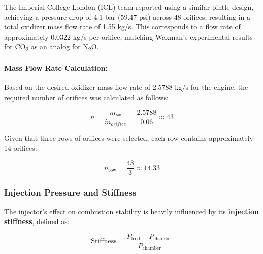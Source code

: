 The Imperial College London (ICL) team reported using a similar pintle design, achieving a pressure drop of 4.1 bar (59.47 psi) across 48 orifices, resulting in a total oxidizer mass flow rate of 1.55 kg/s. This corresponds to a flow rate of approximately 0.0322 kg/s per orifice, matching Waxman’s experimental results for CO\textsubscript{2} as an analog for N\textsubscript{2}O.

\paragraph{Mass Flow Rate Calculation:}
Based on the desired oxidizer mass flow rate of 2.5788 kg/s for the engine, the required number of orifices was calculated as follows:

\begin{equation}
n = \frac{\dot{m}_{ox}}{\dot{m}_{orifice}} = \frac{2.5788}{0.06} \approx 43
\end{equation}

Given that three rows of orifices were selected, each row contains approximately 14 orifices:

\begin{equation}
n_{\text{row}} = \frac{43}{3} \approx 14.33
\end{equation}


\subsubsection{Injection Pressure and Stiffness}

The injector's effect on combustion stability is heavily influenced by its \textbf{injection stiffness}, defined as:

\begin{equation}
\text{Stiffness} = \frac{P_{\text{feed}} - P_{\text{chamber}}}{P_{\text{chamber}}}
\end{equation}

